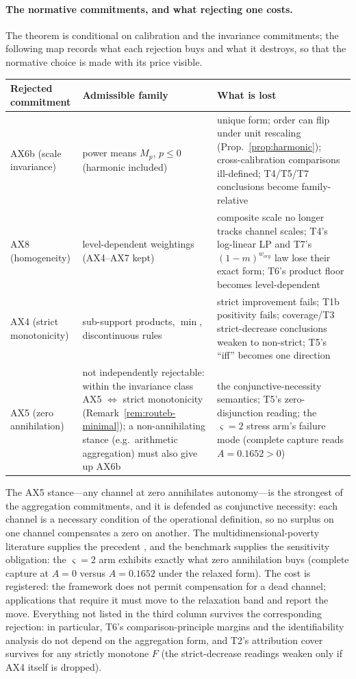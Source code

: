 \paragraph{The normative commitments, and what rejecting one costs.}
The theorem is conditional on calibration and the invariance commitments;
the following map records
what each rejection buys and what it destroys, so that the normative choice is
made with its price visible.
\begin{center}\small
\begin{tabularx}{\textwidth}{@{}l >{\raggedright\arraybackslash}X
>{\raggedright\arraybackslash}X@{}}
\toprule
Rejected commitment & Admissible family & What is lost \\
\midrule
AX6b (scale invariance) & power means $M_p$, $p\le0$ (harmonic included) &
unique form; order can flip under unit rescaling (Prop.~\ref{prop:harmonic});
cross-calibration comparisons ill-defined; T4/T5/T7 conclusions become
family-relative \\
AX8 (homogeneity) & level-dependent weightings (AX4--AX7 kept) &
composite scale no longer tracks channel scales; T4's log-linear LP and T7's
$(1-m)^{w_{org}}$ law lose their exact form; T6's product floor becomes
level-dependent \\
AX4 (strict monotonicity) & sub-support products, $\min$, discontinuous rules &
strict improvement fails; T1b positivity fails; coverage/T3 strict-decrease
conclusions weaken to non-strict; T5's ``iff'' becomes one direction \\
AX5 (zero annihilation) & not independently rejectable: within the invariance
class AX5 $\iff$ strict monotonicity (Remark~\ref{rem:routeb-minimal}); a
non-annihilating stance (e.g.\ arithmetic aggregation) must also give up AX6b &
the conjunctive-necessity semantics; T5's zero-disjunction reading; the
$\varsigma=2$ stress arm's failure mode (complete capture reads
$A=0.1652>0$) \\
\bottomrule
\end{tabularx}
\end{center}
The AX5 stance---any channel at zero annihilates autonomy---is the strongest
of the aggregation commitments, and it is defended as conjunctive necessity:
each channel is a necessary condition of the operational definition, so no
surplus on one channel compensates a zero on another. The
multidimensional-poverty literature supplies the precedent
\citep{alkire2011}, and the benchmark supplies the sensitivity obligation:
the $\varsigma=2$ arm exhibits exactly what zero annihilation buys
(complete capture at $A=0$ versus $A=0.1652$ under the relaxed form). The
cost is registered: the framework does not permit compensation for a dead
channel; applications that require it must move to the relaxation band and
report the move. Everything not listed in the third column survives the
corresponding rejection: in particular, T6's comparison-principle margins and
the identifiability analysis do not depend on the aggregation form, and T2's
attribution cover survives for any strictly monotone $F$ (the strict-decrease
readings weaken only if AX4 itself is dropped).

